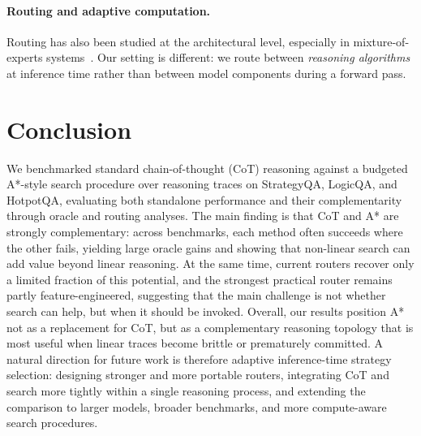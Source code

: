 \documentclass[11pt]{article}
\begin{document}
\paragraph{Routing and adaptive computation.}
Routing has also been studied at the architectural level, especially in mixture-of-experts systems~\cite{shazeer2017outrageouslylargeneuralnetworks}. Our setting is different: we route between \emph{reasoning algorithms} at inference time rather than between model components during a forward pass.




\section{Conclusion}
We benchmarked standard chain-of-thought (CoT) reasoning against a budgeted A*-style search procedure over reasoning traces on StrategyQA, LogicQA, and HotpotQA, evaluating both standalone performance and their complementarity through oracle and routing analyses. The main finding is that CoT and A* are strongly complementary: across benchmarks, each method often succeeds where the other fails, yielding large oracle gains and showing that non-linear search can add value beyond linear reasoning. At the same time, current routers recover only a limited fraction of this potential, and the strongest practical router remains partly feature-engineered, suggesting that the main challenge is not whether search can help, but when it should be invoked. Overall, our results position A* not as a replacement for CoT, but as a complementary reasoning topology that is most useful when linear traces become brittle or prematurely committed. A natural direction for future work is therefore adaptive inference-time strategy selection: designing stronger and more portable routers, integrating CoT and search more tightly within a single reasoning process, and extending the comparison to larger models, broader benchmarks, and more compute-aware search procedures.
\end{document}
